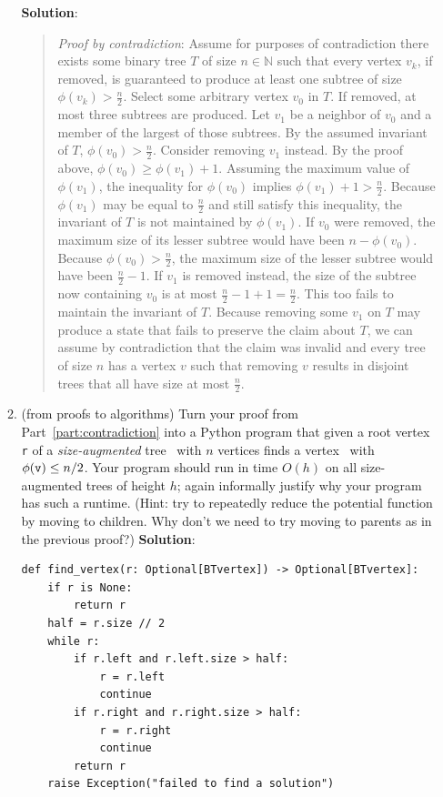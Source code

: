\documentclass[11pt]{article}
\begin{document}
\begin{enumerate}
\begin{enumerate}
  \textbf{Solution}:
  \begin{quote}
    \color{purple}
    \textit{Proof by contradiction}: Assume for purposes of contradiction there exists some binary tree $T$ of size $n \in \mathbb{N}$ such that every vertex $v_k$, if removed, is guaranteed to produce at least one subtree of size $\phi(v_k) > \frac{n}{2}$. \newline
    Select some arbitrary vertex $v_0$ in $T$. If removed, at most three subtrees are produced. Let $v_1$ be a neighbor of $v_0$ and a member of the largest of those subtrees. By the assumed invariant of $T$, $\phi(v_0) > \frac{n}{2}$. \newline 
    Consider removing $v_1$ instead. By the proof above,  $\phi(v_0) \geq \phi(v_1) + 1$. Assuming the maximum value of $\phi(v_1)$, the inequality for $\phi(v_0)$ implies $\phi(v_1) + 1 > \frac{n}{2}$. Because $\phi(v_1)$ may be equal to $\frac{n}{2}$ and still satisfy this inequality, the invariant of $T$ is not maintained by $\phi(v_1)$. \newline
    If $v_0$ were removed, the maximum size of its lesser subtree would have been $n - \phi(v_0)$. Because $\phi(v_0) > \frac{n}{2}$, the maximum size of the lesser subtree would have been $\frac{n}{2} - 1$. If $v_1$ is removed instead, the size of the subtree now containing $v_0$ is at most $\frac{n}{2} - 1 + 1 = \frac{n}{2}$. This too fails to maintain the invariant of $T$. \newline 
    Because removing some $v_1$ on $T$ may produce a state that fails to preserve the claim about $T$, we can assume by contradiction that the claim was invalid and every tree of size $n$ has a vertex $v$ such that removing $v$ results in disjoint trees that all have size at most $\frac{n}{2}$.
\end{quote}

 \item (from proofs to algorithms)  Turn your proof from Part~\ref{part:contradiction} into a Python program that given a root vertex \texttt{r} of a {\em size-augmented} tree \treeT\ with $n$ vertices finds a vertex \btv\ with $\phi(\texttt{v})\leq n/2$. Your program should run in time $O(h)$ on all size-augmented trees of height $h$; again informally justify why your program has such a runtime. (Hint: try to repeatedly reduce the potential function by moving to children. Why don't we need to try moving to parents as in the previous proof?)
\newpage
\textbf{Solution}:
\begin{verbatim}
def find_vertex(r: Optional[BTvertex]) -> Optional[BTvertex]:
    if r is None:
        return r
    half = r.size // 2
    while r:
        if r.left and r.left.size > half:
            r = r.left
            continue
        if r.right and r.right.size > half:
            r = r.right
            continue
        return r
    raise Exception("failed to find a solution")
\end{verbatim}


\end{enumerate}
\end{enumerate}
\end{document}
